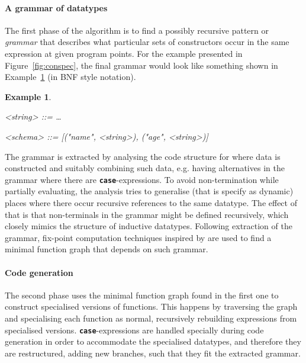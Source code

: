 \documentclass{ituthesis}
\theoremstyle{break}
\newtheorem{exmp}{Example}
\begin{document}
\paragraph{A grammar of datatypes}
\label{par:Findingaminimalgrammar}
The first phase of the algorithm is to find a possibly recursive pattern or \textit{grammar} that describes what particular sets of constructors occur in the same expression
at given program points. For the example presented in Figure~\ref{fig:conspec}, the final grammar would look like something shown in Example~\ref{exmp:grammarspec} (in BNF style notation).

\setlength{\grammarparsep}{12pt plus 1pt minus 1pt} %
\setlength{\grammarindent}{12em}
\begin{exmp}
  \begin{grammar}

    <string> ::= \ldots

    <schema> ::= [("name", <string>), ("age", <string>)]
  \end{grammar}
  \label{exmp:grammarspec}
\end{exmp}

The grammar is extracted by analysing the code structure for where data is constructed and suitably combining such data, e.g. having alternatives in the grammar where there are \texttt{\textbf{case}}-expressions.
To avoid non-termination while partially evaluating, the analysis tries to generalise (that is specify as dynamic) places where there occur recursive references to the same datatype.
The effect of that is that non-terminals in the grammar might be defined recursively, which closely mimics the structure of inductive datatypes.
Following extraction of the grammar, fix-point computation techniques inspired by \textcite{Jones:1986:DFA:512644.512672} are used to find a minimal function graph that depends on such grammar.

\paragraph{Code generation}
\label{par:Code generation}
The second phase uses the minimal function graph found in the first one to construct specialised versions of functions.
This happens by traversing the graph and specialising each function as normal, recursively rebuilding expressions from specialised versions.
\texttt{\textbf{case}}-expressions are handled specially during code generation in order to accommodate the specialised datatypes, and therefore they are restructured, adding new branches, such that they fit the extracted grammar.
\end{document}
